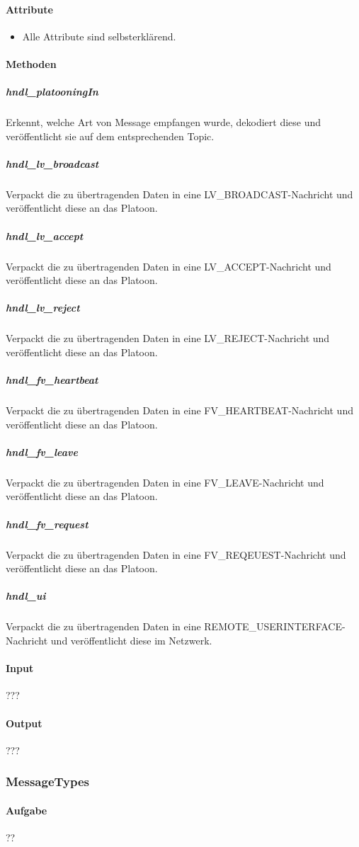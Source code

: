 \documentclass[a4paper, 12pt, titlepage]{scrartcl}
\begin{document}
				\paragraph{Attribute}
				    \begin{itemize}
				        \item Alle Attribute sind selbsterklärend.
				    \end{itemize}
				\paragraph{Methoden}
                    \subparagraph{hndl\_platooningIn} Erkennt, welche Art von Message empfangen wurde, dekodiert diese und veröffentlicht sie auf dem entsprechenden Topic.
					\subparagraph{hndl\_lv\_broadcast} Verpackt die zu übertragenden Daten in eine LV\_BROADCAST-Nachricht und veröffentlicht diese an das Platoon.
					\subparagraph{hndl\_lv\_accept} Verpackt die zu übertragenden Daten in eine LV\_ACCEPT-Nachricht und veröffentlicht diese an das Platoon.
					\subparagraph{hndl\_lv\_reject} Verpackt die zu übertragenden Daten in eine LV\_REJECT-Nachricht und veröffentlicht diese an das Platoon.
                	\subparagraph{hndl\_fv\_heartbeat} Verpackt die zu übertragenden Daten in eine FV\_HEARTBEAT-Nachricht und veröffentlicht diese an das Platoon.
                    \subparagraph{hndl\_fv\_leave} Verpackt die zu übertragenden Daten in eine FV\_LEAVE-Nachricht und veröffentlicht diese an das Platoon.
                	\subparagraph{hndl\_fv\_request} Verpackt die zu übertragenden Daten in eine FV\_REQEUEST-Nachricht und veröffentlicht diese an das Platoon.
                	\subparagraph{hndl\_ui} Verpackt die zu übertragenden Daten in eine REMOTE\_USERINTERFACE-Nachricht und veröffentlicht diese im Netzwerk.
				\paragraph{Input} ???
				\paragraph{Output} ???

			\subsubsection{MessageTypes}
			\label{messages_types}
				\paragraph{Aufgabe} ??
\end{document}
